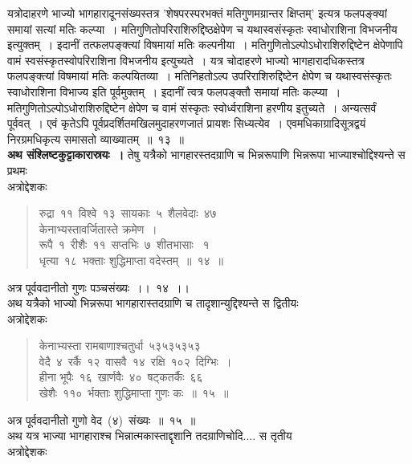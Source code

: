 \documentclass[11pt, openany]{book}
\begin{document}
\newpage
\thispagestyle{fancy}
\fancyhf{}
\noindent
यत्रोदाहरणे भाज्यो भागहारादूनसंख्यस्तत्र 'शेषपरस्परभक्तं मतिगुणमग्रान्तर क्षिप्तम्' इत्यत्र फलपङ्क्यां समायां सत्यां मतिः कल्प्या~। मतिगुणितोपरिराशिरुद्दिष्ठक्षेपेण च यथास्वसंस्कृतः स्वाधोराशिना विभजनीय इत्युक्तम्~। इदानीं तत्फलपङ्क्त्यां विषमायां मतिः कल्पनीया~। मतिगुणितोऽल्पोऽधोराशिरुद्दिष्टेन
क्षेपेणापि वामं स्वसंस्कृतस्वोपरिराशिना विभजनीय इत्युच्यते~। यत्र चोदाहरणे भाज्यो भागहारादधिकस्तत्र फलपङ्क्त्यां विषमायां मतिः कल्पयितव्या~। मतिनिहतोऽल्प उपरिराशिरुद्दिष्टेन क्षेपेण च यथास्वसंस्कृतः स्वाधोराशिना विभाज्य इति पूर्वमुक्तम्~। इदानीं त्वत्र फलपङ्क्तौ समायां मतिः कल्प्या~।
मतिगुणितोऽल्पोऽधोराशिरुद्दिष्टेन क्षेपेण च वामं संस्कृतः स्वोर्ध्वराशिना हरणीय इतुच्यते~। अन्यत्सर्वं पूर्ववत्~। एवं कृतेऽपि पूर्वप्रदर्शितमखिलमुदाहरणजातं प्रायशः सिध्यत्येव~। एवमधिकाग्रादिसूत्रद्वयं निरग्रमधिकृत्य समासतो व्याख्यातम्~॥~१३~॥\\
\indent
\textbf{अथ संश्लिष्टकुट्टाकारास्रयः~।} तेषु यत्रैको भागहारस्तदग्राणि च भिन्नरूपाणि भिन्नरूपा भाज्याश्चोद्दिश्यन्ते स प्रथमः \textendash\\
अत्रोद्देशकः\textendash\begin{quote}
{\ku रुद्रा~११~विश्वे~१३~सायकाः~५~शैलवेदाः~४७\\
केनाभ्यस्तावर्जितास्ते क्रमेण~।\\
रूपै~१~रीशैः~११~सप्तभिः~७~शीतभासाः ~१\\
धृत्या~१८~भक्ताः शुद्धिमाप्ता वदेस्तम्~॥~१४~॥}
\end{quote}
\indent
अत्र पूर्ववदानीतो गुणः पञ्चसंख्यः~।।~१४~।।\\
\indent
अथ यत्रैको भाज्यो भिन्नरूपा भागहारास्तदग्राणि च तादृशान्युद्दिश्यन्ते स द्वितीयः\textendash\\
अत्रोद्देशकः\textendash
\begin{quote}
{\ku केनाभ्यस्ता रामबाणाश्चतुर्धा~५३\textendash५३\textendash५३\textendash५३\\
वेदै~४~रर्कै~१२~वासवै~१४~रक्षि~१०२~दिग्भिः~।\\
हीना भूपैः~१६~खार्णवैः~४०~षट्कतर्कैः~६६\\
खेशैः~११०~र्भक्ताः शुद्धिमाप्ता गुणः कः~॥~१५~॥}
\end{quote}
अत्र पूर्ववदानीतो गुणो वेद~(४)~संख्यः~॥~१५~॥\\
अथ यत्र भाज्या भागहाराश्च भिन्नात्मकास्ताद्दृशानि तदग्राणिचोदि.... स तृतीय\textendash\\
अत्रोद्देशकः\textendash
\end{document}
